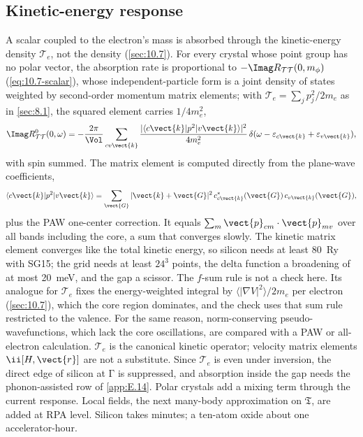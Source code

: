 \subsection{Kinetic-energy response}

A scalar coupled to the electron's mass is absorbed through the kinetic-energy density $\mathcal{T}_e$, not the density (\cref{sec:10.7}). For every crystal whose point group has no polar vector, the absorption rate is proportional to $-\Imag R_{\mathcal{T}\mathcal{T}}(0,m_\phi)$ (\cref{eq:10.7-scalar}), whose independent-particle form is a joint density of states weighted by second-order momentum matrix elements; with $\mathcal{T}_e = \sum_jp_j^2/2m_e$ as in \cref{sec:8.1}, the squared element carries $1/4m_e^2$,
\begin{equation}
  \Imag R^0_{\mathcal{T}\mathcal{T}}(0,\omega) = -\frac{2\pi}{\Vol}\sum_{cv\vect{k}}\frac{|\langle c\vect{k}|p^2|v\vect{k}\rangle|^2}{4m_e^2}\,\delta(\omega - \varepsilon_{c\vect{k}} + \varepsilon_{v\vect{k}}) ,
  \label{eq:E.16-TT}
\end{equation}
with spin summed. The matrix element is computed directly from the plane-wave coefficients,
\begin{equation*}
  \langle c\vect{k}|p^2|v\vect{k}\rangle = \sum_{\vect{G}}|\vect{k}+\vect{G}|^2\,c^*_{c\vect{k}}(\vect{G})\,c_{v\vect{k}}(\vect{G}) ,
\end{equation*}
plus the PAW one-center correction. It equals $\sum_m\vect{p}_{cm}\cdot\vect{p}_{mv}$ over all bands including the core, a sum that converges slowly. The kinetic matrix element converges like the total kinetic energy, so silicon needs at least \SI{80}{Ry} with SG15; the grid needs at least $24^3$ points, the delta function a broadening of at most \SI{20}{meV}, and the gap a scissor. The $f$-sum rule is not a check here. Its analogue for $\mathcal{T}_e$ fixes the energy-weighted integral by $\langle|\nabla V|^2\rangle/2m_e$ per electron (\cref{sec:10.7}), which the core region dominates, and the check uses that sum rule restricted to the valence. For the same reason, norm-conserving pseudo-wavefunctions, which lack the core oscillations, are compared with a PAW or all-electron calculation. $\mathcal{T}_e$ is the canonical kinetic operator; velocity matrix elements $\ii[H,\vect{r}]$ are not a substitute. Since $\mathcal{T}_e$ is even under inversion, the direct edge of silicon at $\mathrm{\Gamma}$ is suppressed, and absorption inside the gap needs the phonon-assisted row of \cref{app:E.14}. Polar crystals add a mixing term through the current response. Local fields, the next many-body approximation on $\mathfrak{T}$, are added at RPA level. Silicon takes minutes; a ten-atom oxide about one accelerator-hour.

